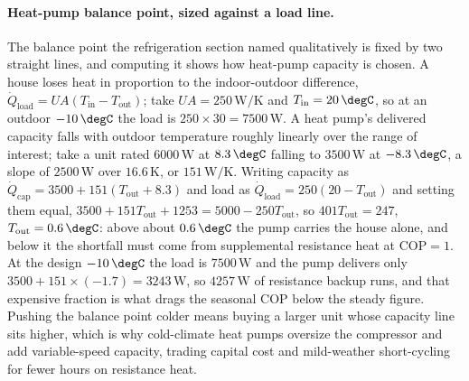\paragraph{Heat-pump balance point, sized against a load line.} The balance point
the refrigeration section named qualitatively is fixed by two straight lines, and
computing it shows how heat-pump capacity is chosen. A house loses heat in
proportion to the indoor-outdoor difference, $\dot Q_{\text{load}} = UA
(T_{\text{in}} - T_{\text{out}})$; take $UA = 250\,\text{W}/\si{\kelvin}$ and
$T_{\text{in}} = 20\,\degC$, so at an outdoor $-10\,\degC$ the load is
$250 \times 30 = 7500\,\text{W}$. A heat pump's delivered capacity falls with
outdoor temperature roughly linearly over the range of interest; take a unit
rated $6000\,\text{W}$ at $8.3\,\degC$ falling to $3500\,\text{W}$ at $-8.3\,\degC$,
a slope of $2500\,\text{W}$ over $16.6\,\si{\kelvin}$, or $151\,\text{W}/\si{\kelvin}$.
Writing capacity as $\dot Q_{\text{cap}} = 3500 + 151(T_{\text{out}} + 8.3)$ and
load as $\dot Q_{\text{load}} = 250(20 - T_{\text{out}})$ and setting them equal,
$3500 + 151 T_{\text{out}} + 1253 = 5000 - 250 T_{\text{out}}$, so
$401 T_{\text{out}} = 247$, $T_{\text{out}} = 0.6\,\degC$: above about
$0.6\,\degC$ the pump carries the house alone, and below it the shortfall must
come from supplemental resistance heat at $\text{COP} = 1$. At the design
$-10\,\degC$ the load is $7500\,\text{W}$ and the pump delivers only
$3500 + 151 \times (-1.7) = 3243\,\text{W}$, so $4257\,\text{W}$ of resistance
backup runs, and that expensive fraction is what drags the seasonal COP below the
steady figure. Pushing the balance point colder means buying a larger unit whose
capacity line sits higher, which is why cold-climate heat pumps oversize the
compressor and add variable-speed capacity, trading capital cost and mild-weather
short-cycling for fewer hours on resistance heat.


